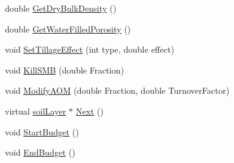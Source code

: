 \begin{DoxyCompactItemize}
\item 
double \hyperlink{classsoil_layer_a208a49fb1c6c738e50e5070682031a0c}{GetDryBulkDensity} ()
\item 
double \hyperlink{classsoil_layer_ac492720707c5061523bb4996b522107f}{GetWaterFilledPorosity} ()
\item 
void \hyperlink{classsoil_layer_a2260db621cbac80d6f348f8288e6b54f}{SetTillageEffect} (int type, double effect)
\item 
void \hyperlink{classsoil_layer_ae48e99b10956f43841d25f5402be1c30}{KillSMB} (double Fraction)
\item 
void \hyperlink{classsoil_layer_a7d58b327ed2900ba76920934d1802da2}{ModifyAOM} (double Fraction, double TurnoverFactor)
\item 
virtual \hyperlink{classsoil_layer}{soilLayer} $\ast$ \hyperlink{classsoil_layer_a53b5e6743e808dd6516867c5de2a0ded}{Next} ()
\item 
void \hyperlink{classsoil_layer_a183d7d2254081522d73ac4abf588691d}{StartBudget} ()
\item 
void \hyperlink{classsoil_layer_ac1c46edeecd5a54044c434adf939301b}{EndBudget} ()
\end{DoxyCompactItemize}
